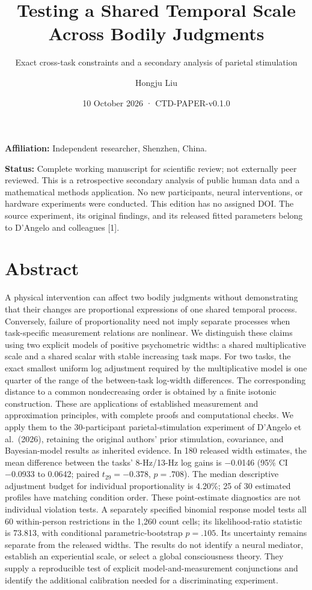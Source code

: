 \documentclass[
  11pt,
]{article}
\title{Testing a Shared Temporal Scale Across Bodily Judgments}
\subtitle{Exact cross-task constraints and a secondary analysis of
parietal stimulation}
\author{Hongju Liu}
\date{10 October 2026 · CTD-PAPER-v0.1.0}
\let\ctdoldsection\section
\renewcommand{\section}{\Needspace{8\baselineskip}\ctdoldsection}
\begin{document}
\maketitle

\textbf{Affiliation:} Independent researcher, Shenzhen, China.

\textbf{Status:} Complete working manuscript for scientific review; not
externally peer reviewed. This is a retrospective secondary analysis of
public human data and a mathematical methods application. No new
participants, neural interventions, or hardware experiments were
conducted. This edition has no assigned DOI. The source experiment, its
original findings, and its released fitted parameters belong to D'Angelo
and colleagues {[}1{]}.

\hypertarget{abstract}{%
\section{Abstract}\label{abstract}}

A physical intervention can affect two bodily judgments without
demonstrating that their changes are proportional expressions of one
shared temporal process. Conversely, failure of proportionality need not
imply separate processes when task-specific measurement relations are
nonlinear. We distinguish these claims using two explicit models of
positive psychometric widths: a shared multiplicative scale and a shared
scalar with stable increasing task maps. For two tasks, the exact
smallest uniform log adjustment required by the multiplicative model is
one quarter of the range of the between-task log-width differences. The
corresponding distance to a common nondecreasing order is obtained by a
finite isotonic construction. These are applications of established
measurement and approximation principles, with complete proofs and
computational checks. We apply them to the 30-participant
parietal-stimulation experiment of D'Angelo et al.~(2026), retaining the
original authors' prior stimulation, covariance, and Bayesian-model
results as inherited evidence. In 180 released width estimates, the mean
difference between the tasks' 8-Hz/13-Hz log gains is −0.0146 (95\% CI
−0.0933 to 0.0642; paired \(t_{29}=-0.378\), \(p=.708\)). The median
descriptive adjustment budget for individual proportionality is 4.20\%;
25 of 30 estimated profiles have matching condition order. These
point-estimate diagnostics are not individual violation tests. A
separately specified binomial response model tests all 60 within-person
restrictions in the 1,260 count cells; its likelihood-ratio statistic is
73.813, with conditional parametric-bootstrap \(p=.105\). Its
uncertainty remains separate from the released widths. The results do
not identify a neural mediator, establish an experiential scale, or
select a global consciousness theory. They supply a reproducible test of
explicit model-and-measurement conjunctions and identify the additional
calibration needed for a discriminating experiment.
\end{document}
